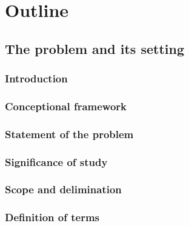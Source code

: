 \section{Outline}
\subsection{The problem and its setting}

\subsubsection{Introduction}
\subsubsection{Conceptional framework}
\subsubsection{Statement of the problem}
\subsubsection{Significance of study}
\subsubsection{Scope and delimination}
\subsubsection{Definition of terms}
